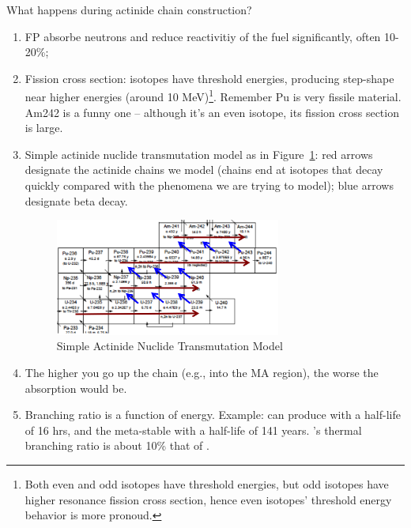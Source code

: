 \documentclass{school-22.211-notes}
\begin{document}
What happens during actinide chain construction? 
\begin{enumerate}
\item FP absorbe neutrons and  reduce reactivitiy of the fuel significantly, often 10-20\%;

\item Fission cross section: isotopes have threshold energies, producing step-shape near higher energies (around 10 MeV)\footnote{Both even and odd isotopes have threshold energies, but odd isotopes have higher resonance fission cross section, hence even isotopes' threshold energy behavior is more pronoud.}. Remember Pu is very fissile material. Am242 is a funny one -- although it's an even isotope, its fission cross section is large. 

\item Simple actinide nuclide transmutation model as in Figure~\ref{actinide-model}: red arrows designate the actinide chains we model (chains end at isotopes that decay quickly compared with the phenomena we are trying to model); blue arrows designate beta decay. 
\begin{figure}[h]
  \centering
  \includegraphics[width=0.7\textwidth]{images/dfs/actinide-model.png}
  \caption{Simple Actinide Nuclide Transmutation Model} \label{actinide-model}
\end{figure}

\item The higher you go up the chain (e.g., into the MA region), the worse the absorption would be. 

\item Branching ratio is a function of energy. Example:  can produce  with a half-life of 16 hrs, and the meta-stable  with a half-life of 141 years. 's thermal branching ratio is about 10\% that of . 
\end{enumerate}
\end{document}
